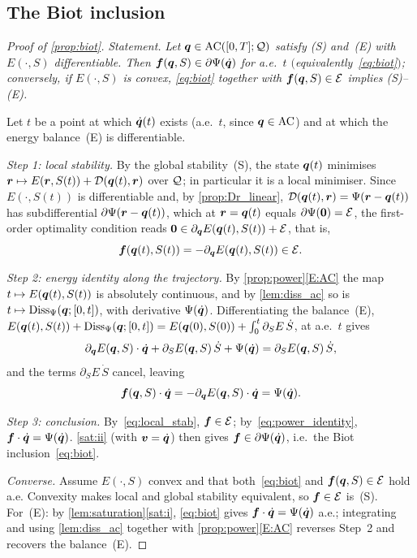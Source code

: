 \subsection{The Biot inclusion}

\begin{proof}[Proof of \cref{prop:biot}]
\emph{Statement.} \emph{Let $\bm{q}\in\mathrm{AC}([0,T];\mathcal{Q})$ satisfy
\textnormal{(S)} and~\textnormal{(E)} with $E(\cdot,S)$ differentiable.
Then $\bm{f}(\bm{q},S)\in\partial\Psi(\dot{\bm{q}})$ for a.e.\ $t$
$($equivalently~\eqref{eq:biot}$)$; conversely, if $E(\cdot,S)$ is
convex, \eqref{eq:biot} together with $\bm{f}(\bm{q},S)\in\mathcal{E}$ implies
\textnormal{(S)}--\textnormal{(E)}.}

\smallskip
Let $t$ be a point at which $\dot{\bm{q}}(t)$ exists (a.e.\ $t$, since
$\bm{q}\in\mathrm{AC}$) and at which the energy balance~(E) is
differentiable.

\emph{Step 1: local stability.} By the global stability~(S), the state
$\bm{q}(t)$ minimises $\bm{r}\mapsto E(\bm{r},S(t))+\mathcal{D}(\bm{q}(t),\bm{r})$
over $\mathcal{Q}$; in particular it is a local minimiser. Since
$E(\cdot,S(t))$ is differentiable and, by \cref{prop:Dr_linear},
$\mathcal{D}(\bm{q}(t),\bm{r})=\Psi(\bm{r}-\bm{q}(t))$ has subdifferential
$\partial\Psi(\bm{r}-\bm{q}(t))$, which at $\bm{r}=\bm{q}(t)$ equals
$\partial\Psi(\bm{0})=\mathcal{E}$, the first-order optimality condition reads
$\bm{0}\in\partial_{\bm{q}}E(\bm{q}(t),S(t))+\mathcal{E}$, that is,
\begin{equation}\label{eq:local_stab}
  \bm{f}(\bm{q}(t),S(t))=-\partial_{\bm{q}}E(\bm{q}(t),S(t))\in\mathcal{E} .
\end{equation}

\emph{Step 2: energy identity along the trajectory.} By
\cref{prop:power}\ref{E:AC} the map $t\mapsto E(\bm{q}(t),S(t))$ is
absolutely continuous, and by \cref{lem:diss_ac} so is
$t\mapsto\mathrm{Diss}_\Psi(\bm{q};[0,t])$, with derivative $\Psi(\dot{\bm{q}})$.
Differentiating the balance~(E),
$E(\bm{q}(t),S(t))+\mathrm{Diss}_\Psi(\bm{q};[0,t])=E(\bm{q}(0),S(0))+\int_0^t\partial_S E\,\dot S$,
at a.e.\ $t$ gives
\[
  \partial_{\bm{q}}E(\bm{q},S)\cdot\dot{\bm{q}}+\partial_S E(\bm{q},S)\,\dot S
  +\Psi(\dot{\bm{q}})=\partial_S E(\bm{q},S)\,\dot S,
\]
and the terms $\partial_S E\,\dot S$ cancel, leaving
\begin{equation}\label{eq:power_identity}
  \bm{f}(\bm{q},S)\cdot\dot{\bm{q}}
  =-\partial_{\bm{q}}E(\bm{q},S)\cdot\dot{\bm{q}}
  =\Psi(\dot{\bm{q}}).
\end{equation}

\emph{Step 3: conclusion.} By~\eqref{eq:local_stab},
$\bm{f}\in\mathcal{E}$; by~\eqref{eq:power_identity},
$\bm{f}\cdot\dot{\bm{q}}=\Psi(\dot{\bm{q}})$. \ref{sat:ii}
(with $\bm{v}=\dot{\bm{q}}$) then gives
$\bm{f}\in\partial\Psi(\dot{\bm{q}})$, i.e.\ the Biot
inclusion~\eqref{eq:biot}.

\emph{Converse.} Assume $E(\cdot,S)$ convex and that both~\eqref{eq:biot}
and $\bm{f}(\bm{q},S)\in\mathcal{E}$ hold a.e. Convexity makes local and global
stability equivalent, so $\bm{f}\in\mathcal{E}$ is~(S). For~(E): by
\cref{lem:saturation}\ref{sat:i}, \eqref{eq:biot} gives
$\bm{f}\cdot\dot{\bm{q}}=\Psi(\dot{\bm{q}})$ a.e.; integrating and using
\cref{lem:diss_ac} together with \cref{prop:power}\ref{E:AC} reverses
Step~2 and recovers the balance~(E).
\end{proof}
